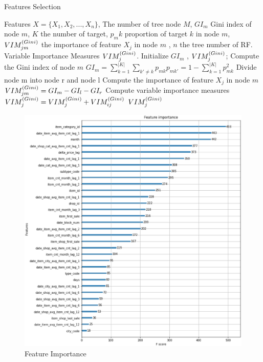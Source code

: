 \begin{algorithm}[htbp]
	\small
	\caption{Features Selection}
	\label{alg:features_selection}
	\begin{algorithmic}[1]
		\REQUIRE
		Features $X=\{ X_1, X_2, ... , X_n \}$,
		The number of tree node $M$,
		$GI_m$ Gini index of node $m$, 
		$ K $ the number of target,
		$ p_mk $ proportion of target $k$ in node $m$,
		$ VIM_{jm}^{\small(Gini)} $ the importance of feature $X_j$ in node $m$ ,
		$ n$ the tree number of RF.
		\ENSURE
		Variable Importance Measures $VIM_{j}^{\small(Gini)}$.
		\STATE
		Initialize $GI_m$ , 
		$VIM_{j}^{\small(Gini)} $;
		\STATE Compute the Gini index of node $m$
		$GI_m = \sum_{k=1}^{|K|} \sum_{k'\neq k} {p_{mk}}{p_{mk'}}=1- \sum_{k=1}^{|K|} p^2_{mk}$
		\ENDFOR
		\STATE Divide node m into node r and node l
		\STATE Compute the importance of feature $X_j$ in node $m$ 
		$VIM_{jm}^{\small(Gini)} = GI_m-GI_l-GI_r $
		\ENDFOR
		\STATE Compute variable importance measures 
		$VIM_{j}^{\small(Gini)} = VIM_{j}^{\small(Gini)} + VIM_{ij}^{\small(Gini)}$
		\ENDFOR
		\RETURN $VIM_{j}^{\small(Gini)}$
	\end{algorithmic}
\end{algorithm}

\begin{figure}[htbp]
	\centering
	\includegraphics[scale=0.3]{figures/FEATURE.eps}
	\caption{Feature Importance}\label{fig:feature_importance}
\end{figure}

